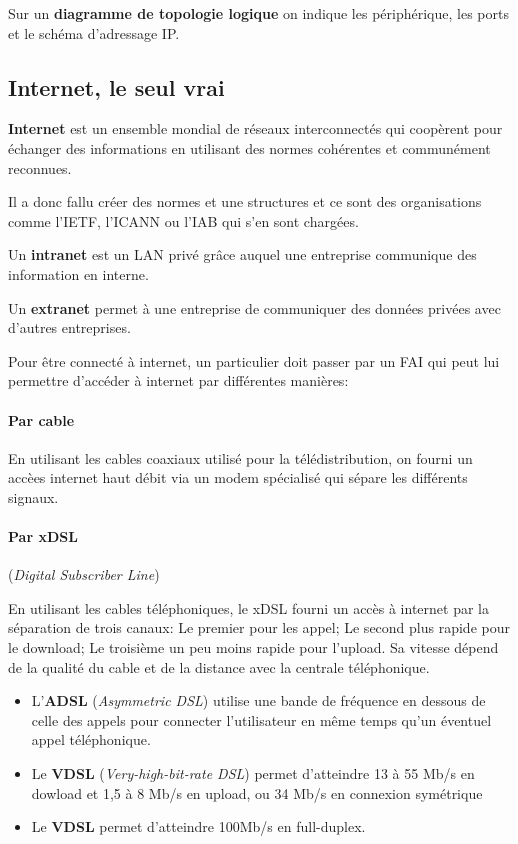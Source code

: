 \documentclass[10pt,a4paper]{article}
\begin{document}
 \smallskip
 \indent
 Sur un \textbf{diagramme de topologie logique} on indique les périphérique, les ports et le schéma d'adressage IP\@.

 \subsection{Internet, le seul vrai}
 \textbf{Internet} est un ensemble mondial de réseaux interconnectés qui coopèrent pour échanger des informations en utilisant des normes cohérentes et communément reconnues.

 \smallskip
 \indent
 Il a donc fallu créer des normes et une structures et ce sont des organisations comme l'IETF, l'ICANN ou l'IAB qui s'en sont chargées.

 \medskip
 \indent
 Un \textbf{intranet} est un LAN privé grâce auquel une entreprise communique des information en interne.

 \smallskip
 \indent
 Un \textbf{extranet} permet à une entreprise de communiquer des données privées avec d'autres entreprises.

 \medskip
 \indent
 Pour être connecté à internet, un particulier doit passer par un FAI qui peut lui permettre d'accéder à internet par différentes manières:

 \paragraph{Par cable}\leavevmode

 \smallskip

 En utilisant les cables coaxiaux utilisé pour la télédistribution, on fourni un accèes internet haut débit via un modem spécialisé qui sépare les différents signaux.

 \paragraph{Par xDSL} (\textit{Digital Subscriber Line})\leavevmode

 \smallskip

 En utilisant les cables téléphoniques, le xDSL fourni un accès à internet par la séparation de trois canaux: Le premier pour les appel; Le second plus rapide pour le download; Le troisième un peu moins rapide pour l'upload. Sa vitesse dépend de la qualité du cable et de la distance avec la centrale téléphonique.
 \begin{itemize}
	 \item L'\textbf{ADSL} (\textit{Asymmetric DSL}) utilise une bande de fréquence en dessous de celle des appels pour connecter l'utilisateur en même temps qu'un éventuel appel téléphonique.
	 \item Le \textbf{VDSL} (\textit{Very-high-bit-rate DSL}) permet d'atteindre 13 à 55 Mb/s en dowload et 1,5 à 8 Mb/s en upload, ou 34 Mb/s en connexion symétrique
	 \item Le \textbf{VDSL} permet d'atteindre 100Mb/s en full-duplex.
 \end{itemize}
\end{document}
